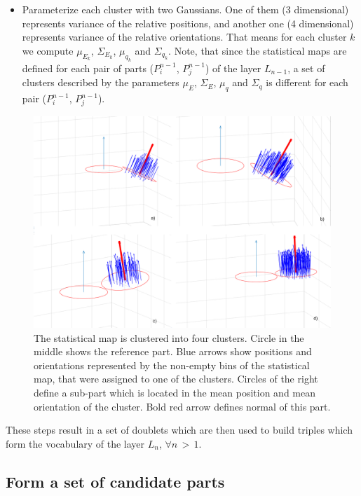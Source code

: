 \documentclass[runningheads]{llncs}
\begin{document}
\begin{itemize}
    \item Parameterize each cluster with two Gaussians. One of them (3 dimensional) represents
variance of the relative positions, and another one (4 dimensional)
represents variance of the relative orientations. That means for
each cluster $k$ we compute $\mu_{E_k}$, $\Sigma_{E_k}$, $\mu_{q_k}$
and $\Sigma_{q_k}$. Note, that since the statistical maps are
defined for each pair of parts ($P_i^{n-1}$, $P_j^{n-1}$) of the
layer $L_{n-1}$, a set of clusters described by the parameters
$\mu_E$, $\Sigma_E$, $\mu_q$ and $\Sigma_q$ is different for each
pair ($P_i^{n-1}$, $P_j^{n-1}$).
\end{itemize}

\begin{figure}
\centering
\includegraphics[scale=0.3]{Clustering}
\caption{The statistical map is clustered into four clusters. Circle
in the middle shows the reference part. Blue arrows show positions
and orientations represented by the non-empty bins of the
statistical map, that were assigned to one of the clusters. Circles
of the right define a sub-part which is located in the mean position
and mean orientation of the cluster. Bold red arrow defines normal
of this part.} \label{fig:clustering}
\end{figure}

These steps result in a set of doublets which are then used to build
triples which form the vocabulary of the layer $L_n$, $\forall
n\,{>}\,1$.

\subsection{Form a set of candidate parts \label{sec:Candidates}}
\end{document}
